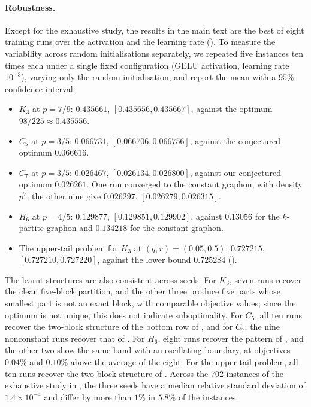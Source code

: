 \documentclass[11pt]{article}
\theoremstyle{plain}
\theoremstyle{definition}
\theoremstyle{remark}
\begin{document}
\paragraph{Robustness.}
Except for the exhaustive study, the results in the main text are the best of eight training runs over the activation and the learning rate (). To measure the variability across random initialisations separately, we repeated five instances ten times each under a single fixed configuration (GELU activation, learning rate $10^{-3}$), varying only the random initialisation, and report the mean with a $95\%$ confidence interval:
\begin{itemize}
  \item $K_3$ at $p = 7/9$: $0.435661$, $[0.435656, 0.435667]$, against the optimum $98/225 \approx 0.435556$.
  \item $C_5$ at $p = 3/5$: $0.066731$, $[0.066706, 0.066756]$, against the conjectured optimum $0.066616$.
  \item $C_7$ at $p = 3/5$: $0.026467$, $[0.026134, 0.026800]$, against our conjectured optimum $0.026261$. One run converged to the constant graphon, with density $p^7$; the other nine give $0.026297$, $[0.026279, 0.026315]$.
  \item $H_6$ at $p = 4/5$: $0.129877$, $[0.129851, 0.129902]$, against $0.13056$ for the $k$-partite graphon and $0.134218$ for the constant graphon.
  \item The upper-tail problem for $K_3$ at $(q, r) = (0.05, 0.5)$: $0.727215$, $[0.727210, 0.727220]$, against the lower bound $0.725284$ ().
\end{itemize}
The learnt structures are also consistent across seeds. For $K_3$, seven runs recover the clean five-block partition, and the other three produce five parts whose smallest part is not an exact block, with comparable objective values; since the optimum is not unique, this does not indicate suboptimality. For $C_5$, all ten runs recover the two-block structure of the bottom row of , and for $C_7$, the nine nonconstant runs recover that of . For $H_6$, eight runs recover the pattern of , and the other two show the same band with an oscillating boundary, at objectives $0.04\%$ and $0.10\%$ above the average of the eight. For the upper-tail problem, all ten runs recover the two-block structure of .
Across the 702 instances of the exhaustive study in , the three seeds have a median relative standard deviation of $1.4 \times 10^{-4}$ and differ by more than $1\%$ in $5.8\%$ of the instances.
\end{document}
